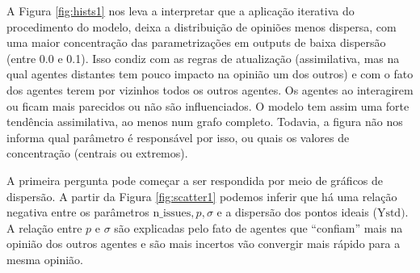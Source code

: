     A Figura \ref{fig:hists1} nos leva a interpretar que a aplicação iterativa
    do procedimento do modelo, deixa a distribuição de opiniões menos dispersa,
    com uma maior concentração das parametrizações em outputs de baixa dispersão
    (entre 0.0 e 0.1). Isso condiz com as regras de atualização (assimilativa,
    mas na qual agentes distantes tem pouco impacto na opinião um dos outros) e
    com o fato dos agentes terem por vizinhos todos os outros agentes. Os
    agentes ao interagirem ou ficam mais parecidos ou não são influenciados. O
    modelo tem assim uma forte tendência assimilativa, ao menos num grafo
    completo. Todavia, a figura não nos informa qual parâmetro é responsável por
    isso, ou quais os valores de concentração (centrais ou extremos).

    A primeira pergunta pode começar a ser respondida por meio de gráficos de
    dispersão. A partir da Figura \ref{fig:scatter1} podemos inferir que há uma
    relação negativa entre os parâmetros \(\text{n\_issues}, p, \sigma \) e a
    dispersão dos pontos ideais (\( \text{Ystd}) \). A relação entre \(p\) e
    \(\sigma\) são explicadas pelo fato de agentes que ``confiam'' mais na opinião
    dos outros agentes e são mais incertos vão convergir mais rápido para a
    mesma opinião.

